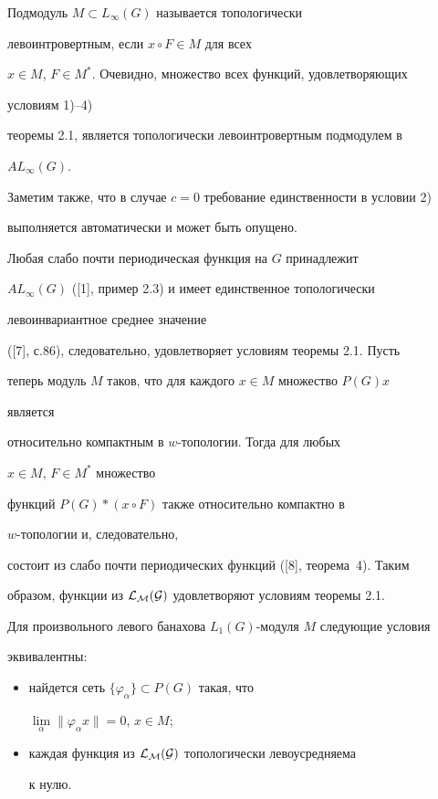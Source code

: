 Подмодуль $M\subset L_\infty(G)$ называется топологически


левоинтровертным, если $x\circ F\in M$ для всех


$x\in M$, $F\in M^*$. Очевидно, множество всех функций, удовлетворяющих


условиям 1)--4)


теоремы 2.1, является топологически левоинтровертным подмодулем в


$AL_\infty(G)$.


Заметим также, что в случае $c=0$ требование единственности в условии 2)


выполняется автоматически и может быть опущено.





\begin{examnonum}


Любая слабо почти периодическая функция на $G$ принадлежит


$AL_\infty(G)$ ([1], пример 2.3) и имеет единственное топологически


левоинвариантное среднее значение


([7], с.86), следовательно, удовлетворяет условиям теоремы 2.1. Пусть


теперь модуль $M$ таков, что для каждого $x\in M$ множество $P(G)x$


является


относительно компактным в $w$-топологии. Тогда для любых


$x\in M$, $F\in M^*$ множество


функций $P(G)\ast(x\circ F)$ также относительно компактно в


$w$-топологии и, следовательно,


состоит из слабо почти периодических функций ([8], теорема~4). Таким


образом, функции из $\cal L_M(G)$ удовлетворяют условиям теоремы 2.1.


\end{examnonum}





\begin{cors}


Для произвольного левого банахова $L_1(G)$-модуля $M$ следующие условия


эквивалентны:


\begin{itemize}


\item[1)] найдется сеть $\{\varphi_\alpha\}\subset P(G)$ такая, что


$\lim\limits_\alpha\|\varphi_\alpha x\|=0$, $x\in M$;


\item[2)] каждая функция из $\cal L_M(G)$ топологически левоусредняема


к нулю.


\end{itemize}


\end{cors}





